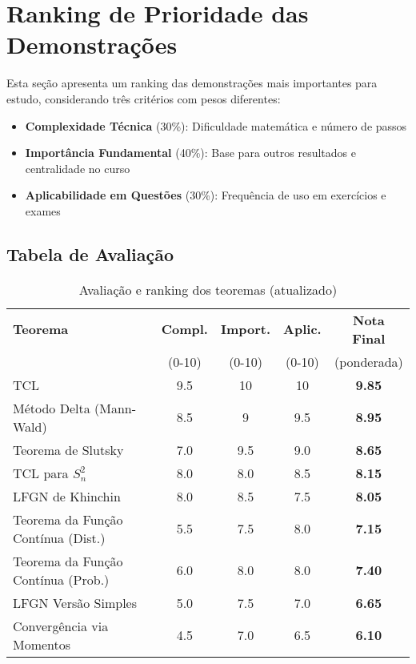 \documentclass[12pt,a4paper]{article}
\theoremstyle{plain}
\theoremstyle{definition}
\theoremstyle{remark}
\begin{document}
\newpage
\section{Ranking de Prioridade das Demonstrações}

Esta seção apresenta um ranking das demonstrações mais importantes para estudo, considerando três critérios com pesos diferentes:
\begin{itemize}
    \item \textbf{Complexidade Técnica} (30\%): Dificuldade matemática e número de passos
    \item \textbf{Importância Fundamental} (40\%): Base para outros resultados e centralidade no curso
    \item \textbf{Aplicabilidade em Questões} (30\%): Frequência de uso em exercícios e exames
\end{itemize}

\subsection{Tabela de Avaliação}

\begin{table}[h]
\centering
\begin{tabular}{|l|c|c|c|c|}
\hline
\textbf{Teorema} & \textbf{Compl.} & \textbf{Import.} & \textbf{Aplic.} & \textbf{Nota Final} \\
 & (0-10) & (0-10) & (0-10) & (ponderada) \\
\hline
TCL & 9.5 & 10 & 10 & \textbf{9.85} \\
\hline
Método Delta (Mann-Wald) & 8.5 & 9 & 9.5 & \textbf{8.95} \\
\hline
Teorema de Slutsky & 7.0 & 9.5 & 9.0 & \textbf{8.65} \\
\hline
TCL para $S_n^2$ & 8.0 & 8.0 & 8.5 & \textbf{8.15} \\
\hline
LFGN de Khinchin & 8.0 & 8.5 & 7.5 & \textbf{8.05} \\
\hline
Teorema da Função Contínua (Dist.) & 5.5 & 7.5 & 8.0 & \textbf{7.15} \\
\hline
Teorema da Função Contínua (Prob.) & 6.0 & 8.0 & 8.0 & \textbf{7.40} \\
\hline
LFGN Versão Simples & 5.0 & 7.5 & 7.0 & \textbf{6.65} \\
\hline
Convergência via Momentos & 4.5 & 7.0 & 6.5 & \textbf{6.10} \\
\hline
\end{tabular}
\caption{Avaliação e ranking dos teoremas (atualizado)}
\end{table}
\end{document}

